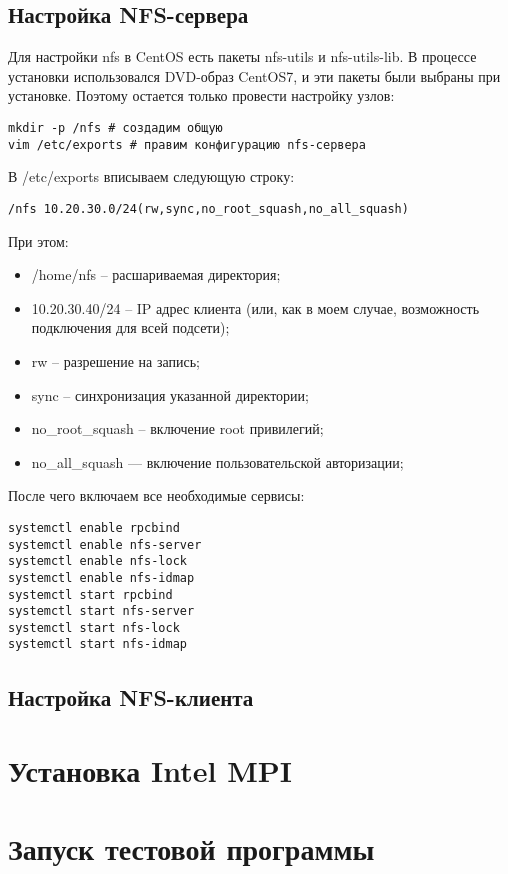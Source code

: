 \subsection{Настройка NFS-сервера}

Для настройки nfs в CentOS есть пакеты \textmd{nfs-utils} и
\textmd{nfs-utils-lib}. В процессе установки
использовался DVD-образ CentOS7, и эти пакеты были выбраны
при установке. Поэтому остается только провести настройку
узлов:

\begin{verbatim}
mkdir -p /nfs # создадим общую
vim /etc/exports # правим конфигурацию nfs-сервера
\end{verbatim}

В /etc/exports вписываем следующую строку:
\begin{verbatim}
/nfs 10.20.30.0/24(rw,sync,no_root_squash,no_all_squash)
\end{verbatim}

При этом:
\begin{itemize}
  \item /home/nfs – расшариваемая директория;
  \item 10.20.30.40/24 – IP адрес клиента (или, как в моем случае, возможность подключения для всей подсети);
  \item rw – разрешение на запись;
  \item sync – синхронизация указанной директории;
  \item no\_root\_squash – включение root привилегий;
  \item no\_all\_squash — включение пользовательской авторизации;
\end{itemize}

После чего включаем все необходимые сервисы:
\begin{verbatim}
systemctl enable rpcbind
systemctl enable nfs-server
systemctl enable nfs-lock
systemctl enable nfs-idmap
systemctl start rpcbind
systemctl start nfs-server
systemctl start nfs-lock
systemctl start nfs-idmap
\end{verbatim}

\subsection{Настройка NFS-клиента}



\section{Установка Intel MPI}

\section{Запуск тестовой программы}
